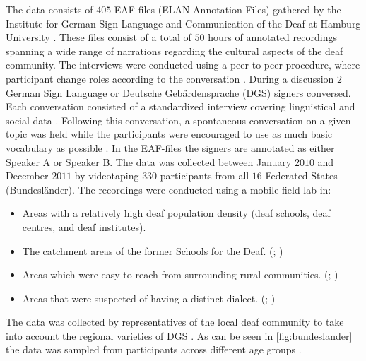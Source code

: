 The data consists of $405$ EAF-files (ELAN Annotation Files) gathered by the Institute for German Sign Language and Communication of the Deaf at Hamburg University \cite{prillwitz2008dgs}. These files consist of a total of $50$ hours of annotated recordings spanning a wide range of narrations regarding the cultural aspects of the deaf community. The interviews were conducted using a peer-to-peer procedure, where participant change roles according to the conversation \cite{prillwitz2008dgs}. During a discussion $2$ German Sign Language or Deutsche Gebärdensprache (DGS) signers conversed. Each conversation consisted of a standardized interview covering linguistical and social data \cite{deaf_areas}. Following this conversation, a spontaneous conversation on a given topic was held while the participants were encouraged to use as much basic vocabulary as possible \cite{deaf_areas}. In the EAF-files the signers are annotated as either Speaker A or Speaker B. The data was collected between January $2010$ and December $2011$  by videotaping $330$ participants from all $16$ Federated States (Bundesländer). The recordings were conducted using a mobile field lab in:

\begin{itemize}
  \item Areas with a relatively high deaf population density (deaf schools, deaf centres, and deaf institutes). \cite{age_data_hamburg} \cite{deaf_areas}
  \item The catchment areas of the former Schools for the Deaf. (\citealp{age_data_hamburg}; \citealp{prillwitz2008dgs})
  \item Areas which were easy to reach from surrounding rural communities. (\citealp{age_data_hamburg}; \citealp{deaf_areas})
  \item Areas that were suspected of having a distinct dialect. (\citealp{age_data_hamburg}; \citealp{prillwitz2008dgs})
\end{itemize}

 The data was collected by representatives of the local deaf community to take into account the regional varieties of DGS \cite{deaf_areas}. As can be seen in \autoref{fig:bundeslander} the data was sampled from participants across different age groups \cite{age_data_hamburg}. 


\mydata

